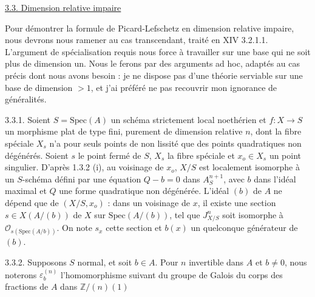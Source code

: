 \underline{3.3. Dimension relative impaire}

Pour démontrer la formule de Picard-Lefschetz en dimension relative impaire, nous devrons nous ramener au cas transcendant, traité en XIV 3.2.1.1. L'argument de spécialisation requis nous force à travailler sur une base qui ne soit plus de dimension un. Nous le ferons par des arguments ad hoc, adaptés au cas précis dont nous avons besoin : je ne dispose pas d'une théorie serviable sur une base de dimension $>1$, et j'ai préféré ne pas recouvrir mon ignorance de généralités.

3.3.1. Soient $S=\mathrm{Spec}(A)$ un schéma strictement local noethérien et $f:X\to S$ un morphisme plat de type fini, purement de dimension relative $n$, dont la fibre spéciale $X_s$ n'a pour seuls points de non lissité que des points quadratiques non dégénérés. Soient $s$ le point fermé de $S$, $X_s$ la fibre spéciale et $x_o\in X_s$ un point singulier. D'après 1.3.2 (i), au voisinage de $x_o$, $X/S$ est localement isomorphe à un $S$-schéma défini par une équation $Q-b=0$ dans $A^{n+1}_S$, avec $b$ dans l'idéal maximal et $Q$ une forme quadratique non dégénérée. L'idéal $(b)$ de $A$ ne dépend que de $(X/S,x_o)$ : dans un voisinage de $x$, il existe une section $s\in X(A/(b))$ de $X$ sur $\mathrm{Spec}(A/(b))$, tel que $J^n_{X/S}$ soit isomorphe à $\mathcal{O}_{s(\mathrm{Spec}(A/b))}$. On note $s_x$ cette section et $b(x)$ un quelconque générateur de $(b)$.



%
%
3.3.2. Supposons $S$ normal, et soit $b\in A$. Pour $n$ invertible dans $A$ et $b\neq 0$, nous noterons $\varepsilon_b^{(n)}$ l'homomorphisme suivant du groupe de Galois du corps des fractions de $A$ dans $\mathbb{Z}/(n)(1)$

